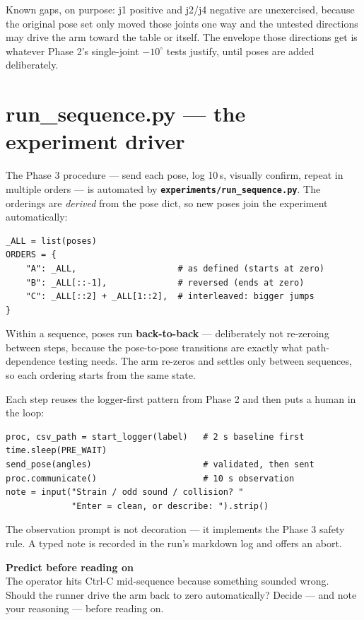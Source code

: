 \documentclass[11pt,twoside,openright]{book}
\newcommand{\code}[1]{\texttt{\bfseries #1}}
\newenvironment{pktpredict}{\begin{pktpredictbox}\textbf{\color{accentorange}Predict before reading on}\\[4pt]}{\end{pktpredictbox}}
\newcommand{\codefile}[1]{%
  \par\vspace{10pt}\noindent{\ttfamily\small\bfseries #1}\par\nopagebreak\vspace{-8pt}}
\begin{document}
Known gaps, on purpose: j1 positive and j2/j4 negative are unexercised,
because the original pose set only moved those joints one way and the
untested directions may drive the arm toward the table or itself. The
envelope those directions get is whatever Phase 2's single-joint
$-10^\circ$ tests justify, until poses are added deliberately.

\section{run\_sequence.py --- the experiment driver}

The Phase 3 procedure --- send each pose, log 10\,s, visually confirm,
repeat in multiple orders --- is automated by
\code{experiments/run\_sequence.py}. The orderings are \emph{derived} from
the pose dict, so new poses join the experiment automatically:

\codefile{experiments/run\_sequence.py}
\begin{lstlisting}[style=pktpython]
_ALL = list(poses)
ORDERS = {
    "A": _ALL,                    # as defined (starts at zero)
    "B": _ALL[::-1],              # reversed (ends at zero)
    "C": _ALL[::2] + _ALL[1::2],  # interleaved: bigger jumps
}
\end{lstlisting}

Within a sequence, poses run \textbf{back-to-back} --- deliberately not
re-zeroing between steps, because the pose-to-pose transitions are exactly
what path-dependence testing needs. The arm re-zeros and settles only
between sequences, so each ordering starts from the same state.

Each step reuses the logger-first pattern from Phase 2 and then puts a
human in the loop:

\begin{lstlisting}[style=pktpython]
proc, csv_path = start_logger(label)   # 2 s baseline first
time.sleep(PRE_WAIT)
send_pose(angles)                      # validated, then sent
proc.communicate()                     # 10 s observation
note = input("Strain / odd sound / collision? "
             "Enter = clean, or describe: ").strip()
\end{lstlisting}

The observation prompt is not decoration --- it implements the Phase 3
safety rule. A typed note is recorded in the run's markdown log and offers
an abort.

\begin{pktpredict}
The operator hits Ctrl-C mid-sequence because something sounded wrong.
Should the runner drive the arm back to zero automatically? Decide ---
and note your reasoning --- before reading on.
\end{pktpredict}
\end{document}
